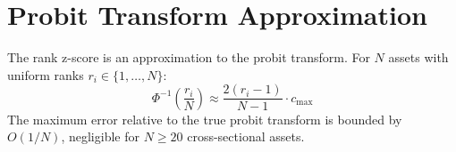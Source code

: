 \documentclass[12pt,a4paper]{article}
\begin{document}
\section{Probit Transform Approximation}

The rank z-score is an approximation to the probit transform. For $N$ assets
with uniform ranks $r_i \in \{1,\ldots,N\}$:
\begin{equation}
    \Phi^{-1}\!\!\left(\frac{r_i}{N}\right) \approx \frac{2(r_i - 1)}{N-1} \cdot c_{\max}
\end{equation}
The maximum error relative to the true probit transform is bounded by
$O(1/N)$, negligible for $N \geq 20$ cross-sectional assets.
\end{document}
